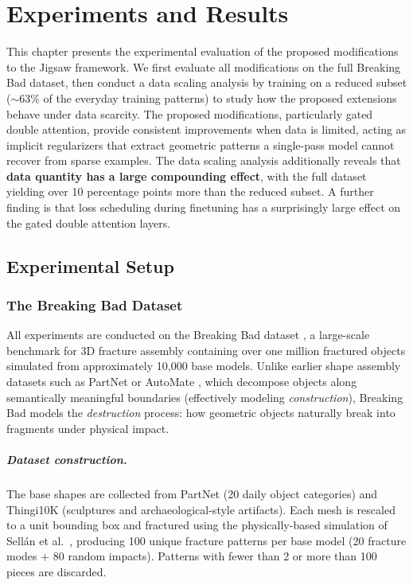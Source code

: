 \chapter{Experiments and Results}
\label{chap:ch6}

This chapter presents the experimental evaluation of the proposed modifications to the Jigsaw framework. We first evaluate all modifications on the full Breaking Bad dataset, then conduct a data scaling analysis by training on a reduced subset ($\sim$63\% of the everyday training patterns) to study how the proposed extensions behave under data scarcity. The proposed modifications, particularly gated double attention, provide consistent improvements when data is limited, acting as implicit regularizers that extract geometric patterns a single-pass model cannot recover from sparse examples. The data scaling analysis additionally reveals that \textbf{data quantity has a large compounding effect}, with the full dataset yielding over 10 percentage points more than the reduced subset. A further finding is that loss scheduling during finetuning has a surprisingly large effect on the gated double attention layers.

\section{Experimental Setup}

\subsection{The Breaking Bad Dataset}

All experiments are conducted on the Breaking Bad dataset \cite{sellan2022breaking}, a large-scale benchmark for 3D fracture assembly containing over one million fractured objects simulated from approximately 10,000 base models. Unlike earlier shape assembly datasets such as PartNet \cite{mo2019partnet} or AutoMate \cite{jones2021automate}, which decompose objects along semantically meaningful boundaries (effectively modeling \emph{construction}), Breaking Bad models the \emph{destruction} process: how geometric objects naturally break into fragments under physical impact.

\paragraph{Dataset construction.}
The base shapes are collected from PartNet (20 daily object categories) and Thingi10K \cite{zhou2016thingi10k} (sculptures and archaeological-style artifacts). Each mesh is rescaled to a unit bounding box and fractured using the physically-based simulation of Sell\'{a}n et al.\ \cite{sellan2022breaking}, producing 100 unique fracture patterns per base model (20 fracture modes + 80 random impacts). Patterns with fewer than 2 or more than 100 pieces are discarded.

